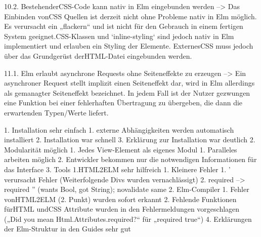   10.2. Bestehender\ac{CSS}-Code kann nativ in Elm eingebunden werden
  --> Das Einbinden von\ac{CSS} Quellen ist derzeit nicht ohne Probleme nativ in Elm möglich. Es verursacht ein „flackern“ und ist nicht für den Gebrauch in einem fertigen System geeignet.\ac{CSS}-Klassen und `inline-styling` sind jedoch nativ in Elm implementiert und erlauben ein Styling der Elemente. Externes\ac{CSS} muss jedoch über das Grundgerüst der\ac{HTML}-Datei eingebunden werden.
  
  11.1. Elm erlaubt asynchrone Requests ohne Seiteneffekte zu erzeugen
  --> Ein asynchroner Request stellt implizit einen Seiteneffekt dar, wird in Elm allerdings als gemanagter Seiteneffekt bezeichnet. In jedem Fall ist der Nutzer gezwungen eine Funktion bei einer fehlerhaften Übertragung zu übergeben, die dann die erwartenden Typen/Werte liefert.
  
  
  
  
  1. Installation sehr einfach
  1. externe Abhängigkeiten werden automatisch installiert
  2. Installation war schnell
  3. Erklärung zur Installation war deutlich
  2. Modularität möglich
  1. Jedes View-Element als eigenes Modul
  1. Paralleles arbeiten möglich
  2. Entwickler bekommen nur die notwendigen Informationen für das Interface
  3. Tools
  1.\ac{HTML}2ELM sehr hilfreich
  1. Kleinere Fehler
  1. ' verursacht Fehler (Weiterfolgende Divs wurden vernachlässigt)
  2. required --> required '' (wants Bool, got String); novalidate same
  2. Elm-Compiler
  1. Fehler von\ac{HTML}2ELM (2. Punkt) wurden sofort erkannt
  2. Fehlende Funktionen für\ac{HTML} und\ac{CSS} Attribute wurden in den Fehlermeldungen vorgeschlagen („Did you mean Html.Attributes.required?“ für „required true“)
  4. Erklärungen der Elm-Struktur in den Guides sehr gut